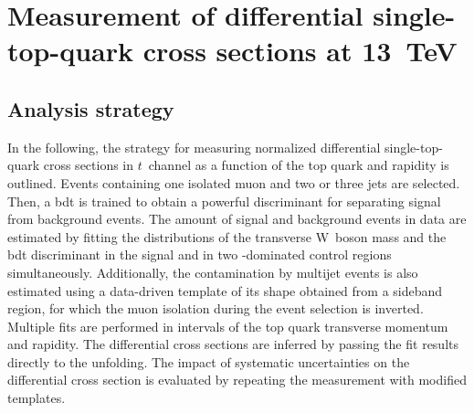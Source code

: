 \chapter{Measurement of differential single-top-quark cross sections at 13~TeV}
\label{ch:diff13}


\section{Analysis strategy}

In the following, the strategy for measuring normalized differential single-top-quark cross sections in $t$~channel as a function of the top quark \pt and rapidity is outlined. Events containing one isolated muon and two or three jets are selected. Then, a \gls{bdt} is trained to obtain a powerful discriminant for separating signal from background events. The amount of signal and background events in data are estimated by fitting the distributions of the transverse W~boson mass and the \gls{bdt} discriminant in the signal and in two \ttbar-dominated control regions simultaneously. Additionally, the contamination by multijet events is also estimated using a data-driven template of its shape obtained from a sideband region, for which the muon isolation during the event selection is inverted. Multiple fits are performed in intervals of the top quark transverse momentum and rapidity. The differential cross sections are inferred by passing the fit results directly to the unfolding. The impact of systematic uncertainties on the differential cross section is evaluated by repeating the measurement with modified templates.

